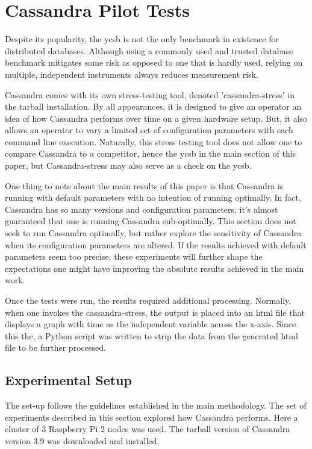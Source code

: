 \chapter{Cassandra Pilot Tests}

Despite its popularity, the \gls{ycsb} is not the only benchmark in existence for distributed databases. Although using a commonly used and trusted database benchmark mitigates some risk as opposed to one that is hardly used, relying on multiple, independent instruments always reduces measurement risk.

Cassandra comes with its own stress-testing tool, denoted 'cassandra-stress' \cite{DatastaxTheTool} in the tarball installation.  By all appearances, it is designed to give an operator an idea of how Cassandra performs over time on a given hardware setup.  But, it also allows an operator to vary a limited set of configuration parameters with each command line execution.  Naturally, this stress testing tool does not allow one to compare Cassandra to a competitor, hence the \gls{ycsb} in the main section of this paper, but Cassandra-stress may also serve as a check on the \gls{ycsb}.

One thing to note about the main results of this paper is that Cassandra is running with default parameters with no intention of running optimally.  In fact, Cassandra has so many versions and configuration parameters, it's almost guaranteed that one is running Cassandra sub-optimally.  This section does not seek to run Cassandra optimally, but rather explore the sensitivity of Cassandra when its configuration parameters are altered.  If the results achieved with default parameters seem too precise, these experiments will further shape the expectations one might have improving the absolute results achieved in the main work.

Once the tests were run, the results required additional processing.  Normally, when one invokes the cassandra-stress, the output is placed into an \gls{html} file that displays a graph with time as the independent variable across the x-axis.  Since this the, a Python script was written to strip the data from the generated \gls{html} file to be further processed.

\section{Experimental Setup}

The set-up follows the guidelines established in the main methodology. The set of experiments described in this section explored how Cassandra performs. Here a cluster of 3 Raspberry Pi 2 nodes was used. The tarball version of Cassandra version 3.9 was downloaded and installed.

